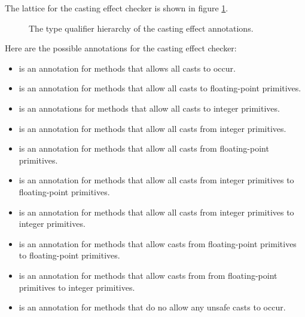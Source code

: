
The lattice for the casting effect checker is shown in figure \ref{fig-casting-hierarchy}.
\begin{figure}
\caption{The type qualifier hierarchy of the casting effect annotations.}
\label{fig-casting-hierarchy}
\end{figure}

\noindent
Here are the possible annotations for the casting effect checker:
\begin{itemize}
\item
{} is an annotation for methods that allows all casts to occur.
\item
{} is an annotation for methods that allow all casts to floating-point primitives.
\item
{} is an annotations for methods that allow all casts to integer primitives.
\item
{} is an annotation for methods that allow all casts from integer primitives.
\item
{} is an annotation for methods that allow all casts from floating-point primitives.
\item
{} is an annotation for methods that allow all casts from integer primitives to floating-point primitives.
\item
{} is an annotation for methods that allow all casts from integer primitives to integer primitives.
\item
{} is an annotation for methods that allow casts from floating-point primitives to floating-point primitives.
\item
{} is an annotation for methods that allow casts from from floating-point primitives to integer primitives.
\item
{} is an annotation for methods that do no allow any unsafe casts to occur.
\end{itemize}

